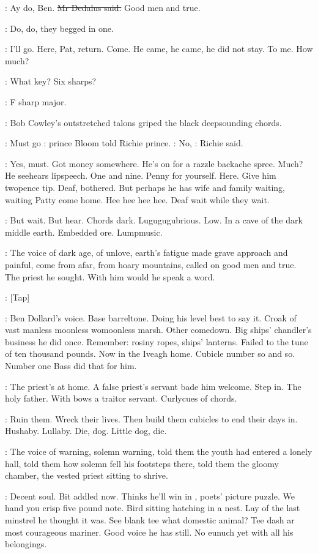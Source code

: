\simon:
Ay do,
Ben.
\sout{Mr Dedalus said.}
Good men and true.

:
Do,
do,
they begged in one.

\BloomInt:
I'll go.
Here,
Pat,
return.
Come.
He came,
he came,
he did not stay.
To me.
How much?

\cowley:
What key?
Six sharps?

\dollard:
F sharp major.

:
Bob Cowley's outstretched talons griped the
black deepsounding chords.

\BloomInt:
Must go
:
prince Bloom told Richie prince.
\goulding:
No,
:
Richie said.

\BloomInt:
Yes,
must.
Got money somewhere.
He's on for a razzle backache spree.
Much?
He
seehears lipspeech.
One and nine.
Penny for yourself.
Here.
Give him
twopence tip.
Deaf,
bothered.
But perhaps he has wife and family waiting,
waiting Patty come home.
Hee hee hee hee.
Deaf wait while they wait.

\BloomInt:
But wait.
But hear.
Chords dark.
Lugugugubrious.
Low.
In a cave of
the dark middle earth.
Embedded ore.
Lumpmusic.

:
The voice of dark age,
of unlove,
earth's fatigue made grave approach
and painful,
come from afar,
from hoary mountains,
called on good men
and true.
The priest he sought.
With him would he speak a word.

\stripling:
[Tap]

\BloomInt:
Ben Dollard's voice.
Base barreltone.
Doing his level best to say it.
Croak of vast manless moonless womoonless marsh.
Other comedown.
Big
ships' chandler's business he did once.
Remember:
rosiny ropes,
ships'
lanterns.
Failed to the tune of ten thousand pounds.
Now in the Iveagh
home.
Cubicle number so and so.
Number one Bass did that for him.

:
The priest's at home.
A false priest's servant bade him welcome.
Step
in.
The holy father.
With bows a traitor servant.
Curlycues of chords.

\BloomInt:
Ruin them.
Wreck their lives.
Then build them cubicles to end their
days in.
Hushaby.
Lullaby.
Die,
dog.
Little dog,
die.

:
The voice of warning,
solemn warning,
told them the youth had
entered a lonely hall,
told them how solemn fell his footsteps there,
told
them the gloomy chamber,
the vested priest sitting to shrive.

\BloomInt:
Decent soul.
Bit addled now.
Thinks he'll win in
,
poets' picture puzzle.
We hand you crisp five pound note.
Bird sitting hatching
in a nest.
Lay of the last minstrel he thought it was.
See blank tee what
domestic animal?
Tee dash ar most courageous mariner.
Good voice he has
still.
No eunuch yet with all his belongings.

